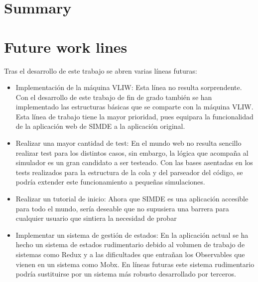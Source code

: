 
\section{Summary}
\label{8:sec:1}

\section{Future work lines}
\label{8:sec:2}

Tras el desarrollo de este trabajo se abren varias líneas futuras: 

\begin{itemize}

\item Implementación de la máquina VLIW: Esta línea no resulta sorprendente. Con el desarrollo de este 
trabajo de fin de grado también se han implementado las estructuras básicas que se comparte con la máquina 
VLIW. Esta línea de trabajo tiene la mayor prioridad, pues equipara la funcionalidad de la aplicación web de 
SIMDE a la aplicación original.

\item Realizar una mayor cantidad de test: En el mundo web no resulta sencillo realizar test 
para los distintos casos, sin embargo, la lógica que acompaña al simulador es un gran candidato a 
ser testeado. Con las bases asentadas en los tests realizados para la estructura de la cola y 
del parseador del código, se podría extender este funcionamiento a pequeñas simulaciones.

\item Realizar un tutorial de inicio: Ahora que SIMDE es una aplicación accesible para todo el mundo, sería
deseable que no supusiera una barrera para cualquier usuario que sintiera la necesidad de probar 

\item Implementar un sistema de gestión de estados: En la aplicación actual se ha hecho un sistema
 de estados rudimentario debido al volumen de trabajo de sistemas como Redux y a las dificultades 
 que entrañan los Observables que vienen en un sistema como Mobx. En líneas futuras este sistema
  rudimentario podría sustituirse por un sistema más robusto desarrollado por terceros.

\end{itemize}
